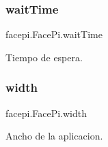 \subsubsection{\texorpdfstring{wait\+Time}{waitTime}}
{\footnotesize\ttfamily facepi.\+Face\+Pi.\+wait\+Time}



Tiempo de espera. 

\mbox{\label{classfacepi_1_1_face_pi_a57e3ba2b24e564c5293372fd32408411}} 
\subsubsection{\texorpdfstring{width}{width}}
{\footnotesize\ttfamily facepi.\+Face\+Pi.\+width}



Ancho de la aplicacion. 

